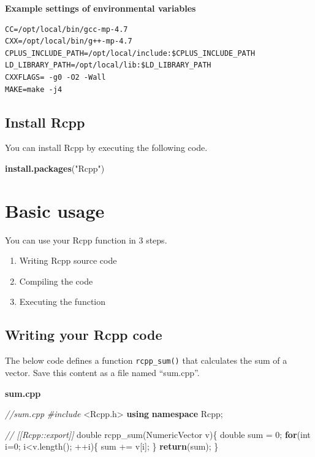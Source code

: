 \documentclass[
]{book}
\newenvironment{Shaded}{\begin{snugshade}}{\end{snugshade}}
\newcommand{\CommentTok}[1]{\textcolor[rgb]{0.56,0.35,0.01}{\textit{#1}}}
\newcommand{\ControlFlowTok}[1]{\textcolor[rgb]{0.13,0.29,0.53}{\textbf{#1}}}
\newcommand{\DataTypeTok}[1]{\textcolor[rgb]{0.13,0.29,0.53}{#1}}
\newcommand{\DecValTok}[1]{\textcolor[rgb]{0.00,0.00,0.81}{#1}}
\newcommand{\ImportTok}[1]{#1}
\newcommand{\KeywordTok}[1]{\textcolor[rgb]{0.13,0.29,0.53}{\textbf{#1}}}
\newcommand{\NormalTok}[1]{#1}
\newcommand{\PreprocessorTok}[1]{\textcolor[rgb]{0.56,0.35,0.01}{\textit{#1}}}
\newcommand{\StringTok}[1]{\textcolor[rgb]{0.31,0.60,0.02}{#1}}
\providecommand{\tightlist}{%
  \setlength{\itemsep}{0pt}\setlength{\parskip}{0pt}}
\begin{document}
\textbf{Example settings of environmental variables}

\begin{verbatim}
CC=/opt/local/bin/gcc-mp-4.7
CXX=/opt/local/bin/g++-mp-4.7
CPLUS_INCLUDE_PATH=/opt/local/include:$CPLUS_INCLUDE_PATH
LD_LIBRARY_PATH=/opt/local/lib:$LD_LIBRARY_PATH
CXXFLAGS= -g0 -O2 -Wall
MAKE=make -j4
\end{verbatim}

\hypertarget{install-rcpp}{%
\section{Install Rcpp}\label{install-rcpp}}

You can install Rcpp by executing the following code.

\begin{Shaded}
\begin{Highlighting}[]
\KeywordTok{install.packages}\NormalTok{(}\StringTok{"Rcpp"}\NormalTok{)}
\end{Highlighting}
\end{Shaded}

\hypertarget{basic-usage}{%
\chapter{Basic usage}\label{basic-usage}}

You can use your Rcpp function in 3 steps.

\begin{enumerate}
\def\labelenumi{\arabic{enumi}.}
\tightlist
\item
  Writing Rcpp source code
\item
  Compiling the code
\item
  Executing the function
\end{enumerate}

\hypertarget{writing-your-rcpp-code}{%
\section{Writing your Rcpp code}\label{writing-your-rcpp-code}}

The below code defines a function \texttt{rcpp\_sum()} that calculates the sum of a vector. Save this content as a file named ``sum.cpp''.

\textbf{sum.cpp}

\begin{Shaded}
\begin{Highlighting}[]
\CommentTok{//sum.cpp}
\PreprocessorTok{#include }\ImportTok{<Rcpp.h>}
\KeywordTok{using} \KeywordTok{namespace}\NormalTok{ Rcpp;}

\CommentTok{// [[Rcpp::export]]}
\DataTypeTok{double}\NormalTok{ rcpp_sum(NumericVector v)\{}
    \DataTypeTok{double}\NormalTok{ sum = }\DecValTok{0}\NormalTok{;}
    \ControlFlowTok{for}\NormalTok{(}\DataTypeTok{int}\NormalTok{ i=}\DecValTok{0}\NormalTok{; i<v.length(); ++i)\{}
\NormalTok{        sum += v[i];}
\NormalTok{    \}}
    \ControlFlowTok{return}\NormalTok{(sum);}
\NormalTok{\}}
\end{Highlighting}
\end{Shaded}
\end{document}
